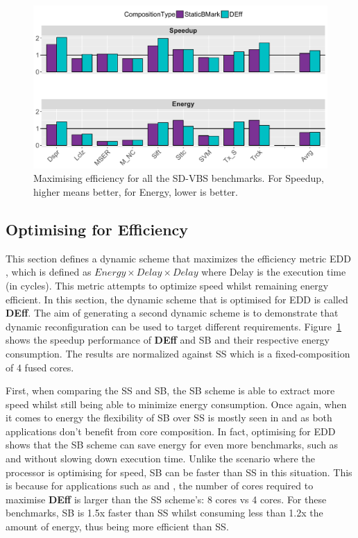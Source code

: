 \begin{figure}[t]
    \centering
    \includegraphics[width=1\textwidth]{cases-paper/graphics/results/edd_bars3.pdf}
    \caption{Maximising efficiency for all the SD-VBS benchmarks. For Speedup, higher means better, for Energy, lower is better.}
    \label{fig:effres}
	\vspace{1em}
\end{figure}

\subsection{Optimising for Efficiency}

This section defines a dynamic scheme that maximizes the efficiency metric EDD \cite{lee2006linreg}, which is defined as $Energy \times Delay \times Delay$ where Delay is the execution time (in cycles).
This metric attempts to optimize speed whilst remaining energy efficient.
In this section, the dynamic scheme that is optimised for EDD is called \textbf{DEff}.
The aim of generating a second dynamic scheme is to demonstrate that dynamic reconfiguration can be used to target different requirements.
Figure~\ref{fig:effres} shows the speedup performance of \textbf{DEff} and SB and their respective energy consumption.
The results are normalized against SS which is a fixed-composition of 4 fused cores.


First, when comparing the SS and SB, the SB scheme is able to extract more speed whilst still being able to minimize energy consumption.
Once again, when it comes to energy the flexibility of SB over SS is mostly seen in  and  as both applications don't benefit from core composition.
In fact, optimising for EDD shows that the SB scheme can save energy for even more benchmarks, such as  and  without slowing down execution time.
Unlike the scenario where the processor is optimising for speed, SB can be faster than SS in this situation.
This is because for applications such as  and , the number of cores required to maximise \textbf{DEff} is larger than the SS scheme's: 8 cores vs 4 cores.
For these benchmarks, SB is 1.5x faster than SS whilst consuming less than 1.2x the amount of energy, thus being more efficient than SS.

